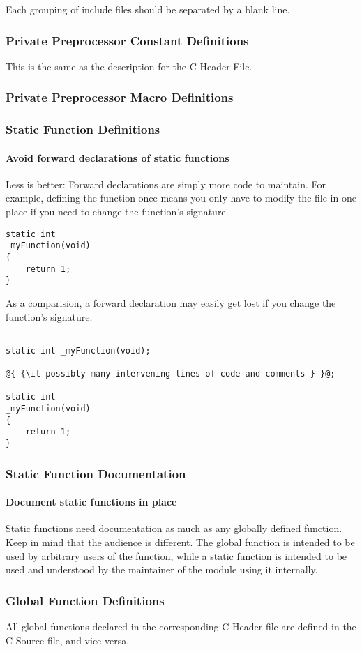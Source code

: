 \documentclass[fleqn,12pt]{PARCOneColumn} %
\begin{document}
Each grouping of include files should be separated by a blank line.

\subsubsection{Private Preprocessor Constant Definitions}

This is the same as the description for the C Header File.

\subsubsection{Private Preprocessor Macro Definitions}

\subsubsection{Static Function Definitions}

\paragraph{Avoid forward declarations of static functions}
Less is better: Forward declarations are simply more code to maintain. For example, defining the function once means you only have to modify the file in one place if you need to change the function's signature.
\begin{lstlisting}
static int
_myFunction(void)
{
    return 1;
}
\end{lstlisting}

As a comparision, a forward declaration may easily get lost if you change the function's signature.

\begin{lstlisting}[backgroundcolor=\color{badCodeColor}]

static int _myFunction(void);

@{ {\it possibly many intervening lines of code and comments } }@;

static int
_myFunction(void)
{
    return 1;
}
\end{lstlisting}

\subsubsection{Static Function Documentation}

\paragraph{Document static functions in place}
Static functions need documentation as much as any globally defined function.
Keep in mind that the audience is different.
The global function is intended to be used by arbitrary users of the function, while a static function is intended to be used and understood by the maintainer of the module using it internally.
\subsubsection{Global Function Definitions}
All global functions declared in the corresponding C Header file are defined in the C Source file, and vice versa.
\end{document}
